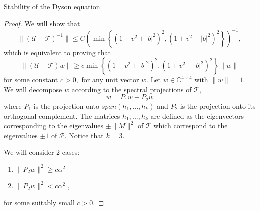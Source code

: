 \documentclass[11pt, a4paper, oneside]{book}
\numberwithin{equation}{chapter}
\newcommand{\TT}{\mathcal{T}}
\newcommand{\UU}{\mathcal{U}}
\begin{document}
\begin{section}{Stability of the Dyson equation}
\begin{proof}
We will show that \begin{equation}
\| (\mathcal{U} - \mathcal{T})^{-1} \| \leq C \left(\min \left \{ (1 - v^2 + |b|^2)^2, (1+v^2-|b|^2)^2\right \}  \right )^{-1} ,
\end{equation}
which is equivalent to proving that
\begin{equation}
\|(\UU-\TT)w\| \geq c \min \left \{(1 - v^2 +|b|^2)^2, (1+v^2-|b|^2)^2\right \}\|w\|
\end{equation}
for some constant $c> 0,$ for any unit vector $w$. Let $w \in \mathbb{C}^{4 \times 4}$ with $\|w\| = 1$. We will decompose $w$ according to the spectral projections of $\mathcal{T}$,
\begin{equation}\label{e:wproj}
w = P_1w + P_2w
\end{equation}
where $P_1$ is the projection onto $span(h_1, ..., h_k)$ and $P_2$ is the projection onto its orthogonal complement. The matrices $h_1,...,h_k$ are defined as the eigenvectors corresponding to the eigenvalues $\pm \|M\|^2$ of $\mathcal{T}$ which correspond to the eigenvalues $\pm 1$ of $\mathscr{P}.$ Notice that $k=3$.

We will consider 2 cases:
\begin{enumerate}
\item[Case 1:] $  \|P_2w\|^2 \geq c \alpha^2$
\item[Case 2:] $  \|P_2w\|^2 <  c \alpha^2$ ,
\end{enumerate}
for some suitably small $c>0$.


\end{proof}
\end{section}
\end{document}
